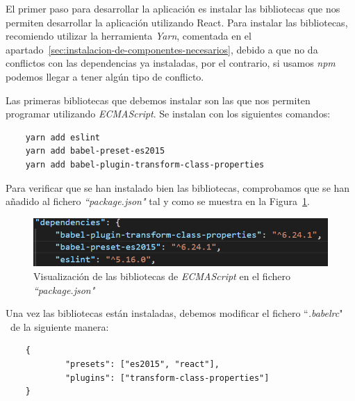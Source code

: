 \documentclass[a4paper, 12pt]{book}
\begin{document}
\vspace{5mm}
El primer paso para desarrollar la aplicación es instalar las bibliotecas que nos permiten desarrollar la aplicación utilizando React. Para instalar las bibliotecas, recomiendo utilizar la herramienta \textit{Yarn}, comentada en el apartado~\ref{sec:instalacion-de-componentes-necesarios}, debido a que no da conflictos con las dependencias ya instaladas, por el contrario, si usamos \textit{npm} podemos llegar a tener algún tipo de conflicto.

Las primeras bibliotecas que debemos instalar son las que nos permiten programar utilizando \textit{ECMAScript}. Se instalan con los siguientes comandos: 
\begin{verbatim}
    yarn add eslint
    yarn add babel-preset-es2015
    yarn add babel-plugin-transform-class-properties
\end{verbatim} 
Para verificar que se han instalado bien las bibliotecas, comprobamos que se han añadido al fichero \textit{``package.json"} tal y como se muestra en la Figura~\ref{fig:package_babelrc}.
\begin{figure}[h]
  \centering
  \includegraphics{img_usadas/package_babelrc.png}
  \caption{Visualización de las bibliotecas de \textit{ECMAScript} en el fichero \textit{``package.json"}}
  \label{fig:package_babelrc}
\end{figure}

Una vez las bibliotecas están instaladas, debemos modificar el fichero ``\textit{.babelrc}" \ de la siguiente manera:
\begin{verbatim}
    {
	        "presets": ["es2015", "react"],
	        "plugins": ["transform-class-properties"]
    }
\end{verbatim}
\end{document}

